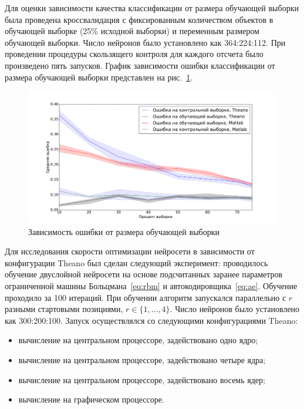Для оценки зависимости качества классификации от размера обучающей выборки была проведена кроссвалидация с фиксированным количеством объектов в обучающей выборке (25\% исходной выборки) и переменным размером обучающей выборки. Число нейронов было установлено как 364:224:112. При проведении процедуры скользящего контроля для каждого отсчета было произведено пять запусков. График зависимости ошибки классификации от размера обучающей выборки представлен на рис.~\ref{fig:samples}.


\begin{figure}[tb!]
 \centering
  \includegraphics[width=1.0\textwidth]{plots/popova/samples.pdf}
 \caption{Зависимость ошибки от размера обучающей выборки}
 \label{fig:samples}
\end{figure}


Для исследования скорости оптимизации нейросети в зависимости от конфигурации Theano был сделан следующий эксперимент:
проводилось обучение двуслойной нейросети на основе подсчитанных заранее параметров ограниченной машины Больцмана~\eqref{eq:rbm} и автокодировщика~\eqref{eq:ae}. Обучение проходило за 100 итераций. При обучении алгоритм запускался параллельно с $r$ разными стартовыми позициями, $r \in \{1,\dots,4\}.$ Число нейронов было установлено как 300:200:100.
Запуск осуществлялся со следующими конфигурациями Theano:
\begin{itemize}
\item вычисление на центральном процессоре, задействовано
одно ядро;
\item вычисление на центральном процессоре, задействовано четыре ядра;
\item вычисление на центральном процессоре, задействовано восемь ядер;
\item вычисление на графическом процессоре.
\end{itemize}

